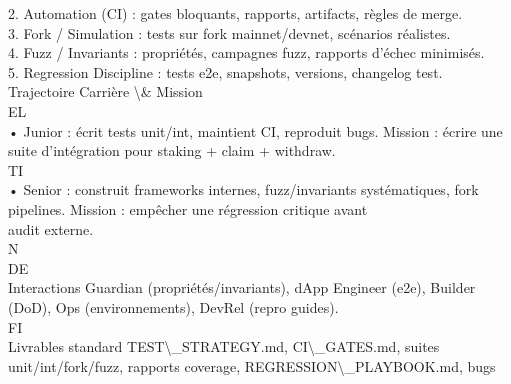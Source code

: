 \documentclass[12pt,landscape,a4paper]{article}
\begin{document}
2. Automation (CI) : gates bloquants, rapports, artifacts, règles de merge.\\
\vspace{0.5em}
3. Fork / Simulation : tests sur fork mainnet/devnet, scénarios réalistes.\\
\vspace{0.5em}
4. Fuzz / Invariants : propriétés, campagnes fuzz, rapports d’échec minimisés.\\
\vspace{0.5em}
5. Regression Discipline : tests e2e, snapshots, versions, changelog test.\\
\vspace{0.5em}
Trajectoire Carrière \textbackslash{}& Mission\\
\vspace{0.5em}
\vspace{0.5em}
\vspace{0.5em}
\vspace{0.5em}
EL\\
• Junior : écrit tests unit/int, maintient CI, reproduit bugs. Mission : écrire une suite d’intégration pour staking + claim + withdraw.\\
\vspace{0.5em}
\vspace{0.5em}
\vspace{0.5em}
\vspace{0.5em}
TI\\
• Senior : construit frameworks internes, fuzz/invariants systématiques, fork pipelines. Mission : empêcher une régression critique avant\\
audit externe.\\
\vspace{0.5em}
\vspace{0.5em}
\vspace{0.5em}
\vspace{0.5em}
N\\
DE\\
Interactions Guardian (propriétés/invariants), dApp Engineer (e2e), Builder (DoD), Ops (environnements), DevRel (repro guides).\\
\vspace{0.5em}
\vspace{0.5em}
\vspace{0.5em}
\vspace{0.5em}
FI\\
Livrables standard     TEST\textbackslash{}_STRATEGY.md, CI\textbackslash{}_GATES.md, suites unit/int/fork/fuzz, rapports coverage, REGRESSION\textbackslash{}_PLAYBOOK.md, bugs\\
\end{document}
